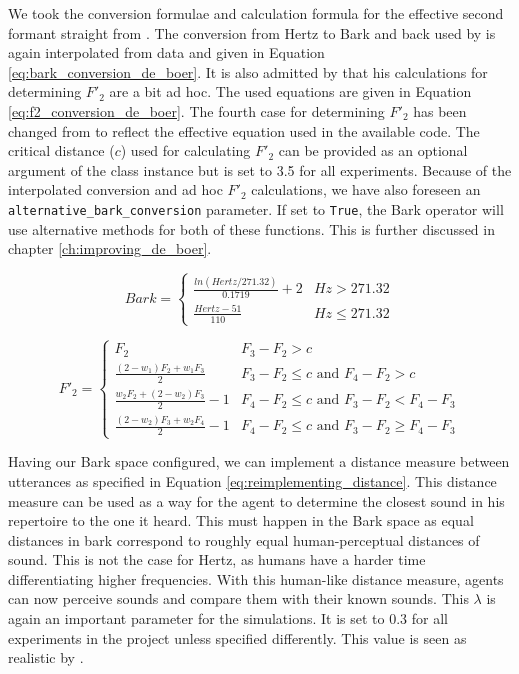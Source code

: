 We took the conversion formulae and calculation formula for the effective second formant straight from \citet{deBoer2000}.
The conversion from Hertz to Bark and back used by \citet{deBoer2000} is again interpolated from data and given in Equation \ref{eq:bark_conversion_de_boer}.
It is also admitted by \citet{deBoer2000} that his calculations for determining $F'_2$ are a bit ad hoc.
The used equations are given in Equation \ref{eq:f2_conversion_de_boer}.
The fourth case for determining $F'_2$ has been changed from \citet{deBoer2000} to reflect the effective equation used in the available code.
The critical distance ($c$) used for calculating $F'_2$ can be provided as an optional argument of the class instance but is set to 3.5 for all experiments.
Because of the interpolated conversion and ad hoc $F'_2$ calculations, we have also foreseen an \texttt{alternative\_bark\_conversion} parameter.
If set to \texttt{True}, the Bark operator will use alternative methods for both of these functions.
This is further discussed in chapter \ref{ch:improving_de_boer}.

\begin{equation}
  Bark =
    \begin{cases}
      \frac{ln(Hertz/271.32)}{0.1719} + 2 & Hz > 271.32\\
      \frac{Hertz - 51}{110}  & Hz \leq 271.32
    \end{cases} 
\label{eq:bark_conversion_de_boer}      
\end{equation}

\begin{equation}
  F'_2 =
    \begin{cases}
      F_2 & F_3 - F_2 > c \\
      \frac{(2-w_1) F_2 + w_1 F_3}{2} & F_3 - F_2 \leq c \text{ and } F_4 - F_2 > c \\
      \frac{w_2 F_2 + (2-w_2) F_3}{2} - 1 & F_4 - F_2 \leq c \text{ and } F_3 - F_2 < F_4 - F_3 \\
      \frac{(2-w_2) F_3 + w_2 F_4}{2} - 1 & F_4 - F_2 \leq c \text{ and } F_3 - F_2 \geq F_4 - F_3
    \end{cases} 
\label{eq:f2_conversion_de_boer}      
\end{equation}

Having our Bark space configured, we can implement a distance measure between utterances as specified in Equation \ref{eq:reimplementing_distance}.
This distance measure can be used as a way for the agent to determine the closest sound in his repertoire to the one it heard.
This must happen in the Bark space as equal distances in bark correspond to roughly equal human-perceptual distances of sound.
This is not the case for Hertz, as humans have a harder time differentiating higher frequencies.
With this human-like distance measure, agents can now perceive sounds and compare them with their known sounds.
This $\lambda$ is again an important parameter for the simulations.
It is set to $0.3$ for all experiments in the project unless specified differently.
This value is seen as realistic by \citet{Schwartz1997, deBoer2000, vallee1994, 1985book}.

